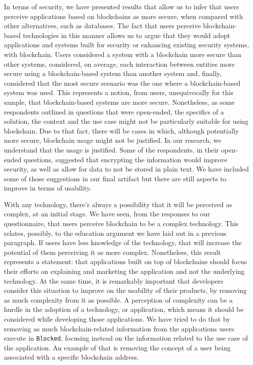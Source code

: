 In terms of security, we have presented results that allow us to infer that users perceive applications based on blockchains as more secure, when compared with other alternatives, such as databases. The fact that users perceive blockchain-based technologies in this manner allows us to argue that they would adopt applications and systems built for security or enhancing existing security systems, with blockchain. Users considered a system with a blockchain more secure than other systems, considered, on average, each interaction between entities more secure using a blockchain-based system than another system and, finally, considered that the most secure scenario was the one where a blockchain-based system was used. This represents a notion, from users, unequivocally for this sample, that blockchain-based systems are more secure. Nonetheless, as some respondents outlined in questions that were open-ended, the specifics of a solution, the context and the use case might not be particularly suitable for using blockchain. Due to that fact, there will be cases in which, although potentially more secure, blockchain usage might not be justified. In our research, we understand that the usage is justified. Some of the respondents, in their open-ended questions, suggested that encrypting the information would improve security, as well as allow for data to not be stored in plain text. We have included some of those suggestions in our final artifact but there are still aspects to improve in terms of usability.

With any technology, there's always a possibility that it will be perceived as complex, at an initial stage. We have seen, from the responses to our questionnaire, that users perceive blockchain to be a complex technology. This relates, possibly, to the education argument we have laid out in a previous paragraph. If users have less knowledge of the technology, that will increase the potential of them perceiving it as more complex. Nonetheless, this result represents a statement: that applications built on top of blockchains should focus their efforts on explaining and marketing the application and not the underlying technology. At the same time, it is remarkably important that developers consider this situation to improve on the usability of their products, by removing as much complexity from it as possible. A perception of complexity can be a hurdle in the adoption of a technology, or application, which means it should be considered while developing those applications. We have tried to do that by removing as much blockchain-related information from the applications users execute in \texttt{Blocked}, focusing instead on the information related to the use case of the application. An example of that is removing the concept of a user being associated with a specific blockchain address.

